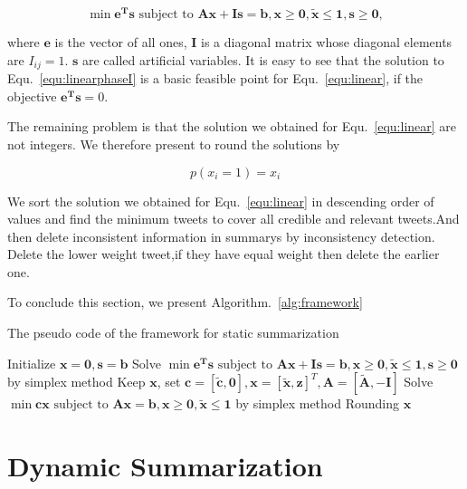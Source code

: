 \documentclass{llncs}
\begin{document}
\begin{equation}\label{equ:linearphaseI}
\min \mathbf{e^{T}s} \textrm{ subject to } \mathbf{Ax} + \mathbf{Is} = \mathbf{b}, \mathbf{x}\geq \mathbf{0},\tilde{\mathbf{x}} \leq \mathbf{1},\mathbf{s}\geq \mathbf{0},
\end{equation}

where $\mathbf{e}$ is the vector of all ones, $\mathbf{I}$ is a diagonal matrix whose diagonal elements are $I_{ij}=1$. $\mathbf{s}$ are called artificial variables. It is easy to see that the solution to Equ.~\ref{equ:linearphaseI} is a basic feasible point for Equ.~\ref{equ:linear}, if the objective $\mathbf{e^{T}s}=0 $.

The remaining problem is that the solution we obtained for Equ.~\ref{equ:linear} are not integers. We therefore present to round the solutions by

\begin{equation}
p(x_i=1)= x_i
\end{equation}

We sort the solution we obtained for Equ.~\ref{equ:linear} in descending order of values and find the minimum tweets to cover all credible and relevant tweets.And then delete inconsistent information in summarys by inconsistency detection. Delete the lower weight tweet,if they have equal weight then delete the earlier one.

To conclude this section, we present Algorithm.~\ref{alg:framework}

\begin{algorithm}\label{alg:framework}
\caption{The pseudo code of the framework for static summarization}

Initialize $\mathbf{x}=\mathbf{0},\mathbf{s}=\mathbf{b}$\;
Solve $\min \mathbf{e^{T}s} \textrm{ subject to } \mathbf{Ax} + \mathbf{Is} = \mathbf{b}, \mathbf{x}\geq \mathbf{0},\tilde{\mathbf{x}} \leq \mathbf{1},\mathbf{s}\geq \mathbf{0}$ by simplex method\;
Keep $\mathbf{x}$, set $\mathbf{c}=[\tilde{\mathbf{c}},\mathbf{0}],\mathbf{x}=[\tilde{\mathbf{x}},\mathbf{z}]^T,\mathbf{A}=[\tilde{\mathbf{A}},-\mathbf{I}]$ \;
Solve $\min \mathbf{cx} \textrm{ subject to } \mathbf{Ax} = \mathbf{b}, \mathbf{x}\geq \mathbf{0},\tilde{\mathbf{x}} \leq \mathbf{1}$ by simplex method\;
Rounding $\mathbf{x}$\;
\end{algorithm}



\section{Dynamic Summarization}\label{sec:dynamic}
\end{document}
